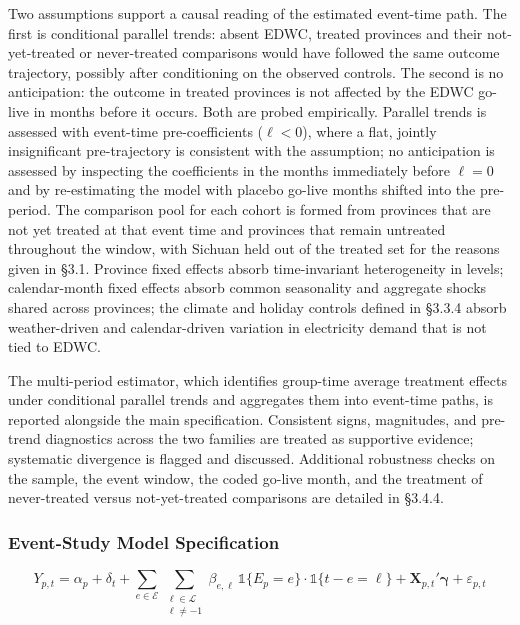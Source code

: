 \documentclass[12pt,a4paper]{article}
\begin{document}
Two assumptions support a causal reading of the estimated event-time
path. The first is conditional parallel trends: absent EDWC, treated
provinces and their not-yet-treated or never-treated comparisons
would have followed the same outcome trajectory, possibly after
conditioning on the observed controls. The second is no anticipation:
the outcome in treated provinces is not affected by the EDWC go-live
in months before it occurs. Both are probed empirically. Parallel
trends is assessed with event-time pre-coefficients ($\ell < 0$),
where a flat, jointly insignificant pre-trajectory is consistent with
the assumption; no anticipation is assessed by inspecting the
coefficients in the months immediately before $\ell = 0$ and by
re-estimating the model with placebo go-live months shifted into the
pre-period. The comparison pool for each cohort is formed from
provinces that are not yet treated at that event time and provinces
that remain untreated throughout the window, with Sichuan held out
of the treated set for the reasons given in §3.1. Province fixed
effects absorb time-invariant heterogeneity in levels; calendar-month
fixed effects absorb common seasonality and aggregate shocks shared
across provinces; the climate and holiday controls defined in §3.3.4
absorb weather-driven and calendar-driven variation in electricity
demand that is not tied to EDWC.

The multi-period
\citet{callawaysantanna-2021-differenceindifferencesmultipletimea}
estimator, which identifies group-time average treatment effects
under conditional parallel trends and aggregates them into event-time
paths, is reported alongside the main specification. Consistent signs,
magnitudes, and pre-trend diagnostics across the two families are
treated as supportive evidence; systematic divergence is flagged and
discussed. Additional robustness checks on the sample, the event
window, the coded go-live month, and the treatment of never-treated
versus not-yet-treated comparisons are detailed in §3.4.4.

\subsubsection{Event-Study Model Specification}

\begin{equation}
Y_{p,t} = \alpha_p + \delta_t
+ \sum_{e \in \mathcal{E}} \sum_{\substack{\ell \in \mathcal{L} \\ \ell \neq -1}}
  \beta_{e,\ell} \, \mathbb{1}\{E_p = e\} \cdot \mathbb{1}\{t - e = \ell\}
+ \mathbf{X}_{p,t}' \boldsymbol{\gamma}
+ \varepsilon_{p,t}
\label{eq:event_study}
\end{equation}
\end{document}
